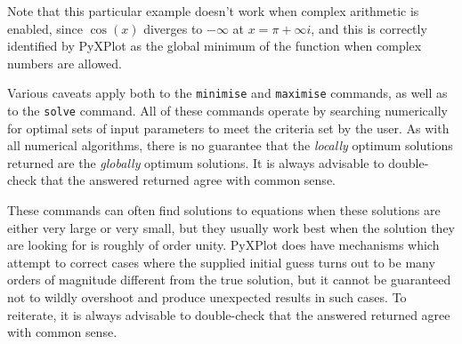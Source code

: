 \vspace{3mm}
\newline
{}\newline
{}\newline
{}\newline
{}
\vspace{3mm}

\noindent Note that this particular example doesn't work when complex
arithmetic is enabled, since $\cos(x)$ diverges to $-\infty$ at $x=\pi+\infty
i$, and this is correctly identified by PyXPlot as the global minimum of the
function when complex numbers are allowed.

Various caveats apply both to the {\tt minimise} and {\tt maximise} commands,
as well as to the {\tt solve} command.  All of these commands operate by
searching numerically for optimal sets of input parameters to meet the criteria
set by the user. As with all numerical algorithms, there is no guarantee that
the {\it locally} optimum solutions returned are the {\it globally} optimum
solutions. It is always advisable to double-check that the answered returned
agree with common sense.

These commands can often find solutions to equations when these solutions are
either very large or very small, but they usually work best when the solution
they are looking for is roughly of order unity.  PyXPlot does have mechanisms
which attempt to correct cases where the supplied initial guess turns out to be
many orders of magnitude different from the true solution, but it cannot be
guaranteed not to wildly overshoot and produce unexpected results in such
cases.  To reiterate, it is always advisable to double-check that the answered
returned agree with common sense.

